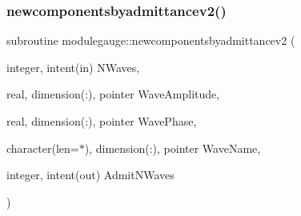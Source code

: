 \subsubsection{\texorpdfstring{newcomponentsbyadmittancev2()}{newcomponentsbyadmittancev2()}}
{\footnotesize\ttfamily subroutine modulegauge\+::newcomponentsbyadmittancev2 (\begin{DoxyParamCaption}\item[{integer, intent(in)}]{N\+Waves,  }\item[{real, dimension(\+:), pointer}]{Wave\+Amplitude,  }\item[{real, dimension(\+:), pointer}]{Wave\+Phase,  }\item[{character(len=$\ast$), dimension(\+:), pointer}]{Wave\+Name,  }\item[{integer, intent(out)}]{Admit\+N\+Waves }\end{DoxyParamCaption})\hspace{0.3cm}{\ttfamily [private]}}

